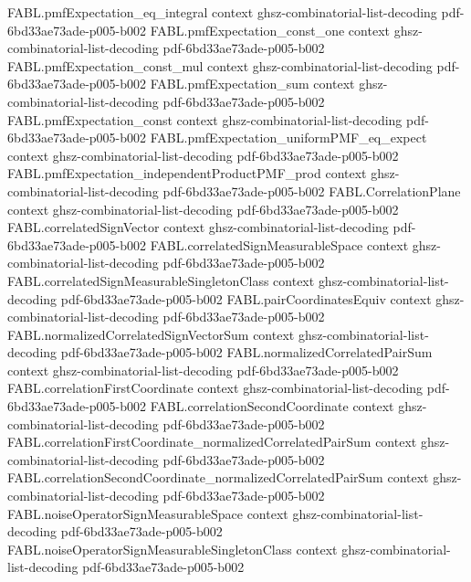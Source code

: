 \begin{theorem}
  {FABL.pmfExpectation_eq_integral}
  {context}
  {ghsz-combinatorial-list-decoding}
  {pdf-6bd33ae73ade-p005-b002}
\proofstep
  {FABL.pmfExpectation_const_one}
  {context}
  {ghsz-combinatorial-list-decoding}
  {pdf-6bd33ae73ade-p005-b002}
\proofstep
  {FABL.pmfExpectation_const_mul}
  {context}
  {ghsz-combinatorial-list-decoding}
  {pdf-6bd33ae73ade-p005-b002}
\proofstep
  {FABL.pmfExpectation_sum}
  {context}
  {ghsz-combinatorial-list-decoding}
  {pdf-6bd33ae73ade-p005-b002}
\proofstep
  {FABL.pmfExpectation_const}
  {context}
  {ghsz-combinatorial-list-decoding}
  {pdf-6bd33ae73ade-p005-b002}
\proofstep
  {FABL.pmfExpectation_uniformPMF_eq_expect}
  {context}
  {ghsz-combinatorial-list-decoding}
  {pdf-6bd33ae73ade-p005-b002}
\proofstep
  {FABL.pmfExpectation_independentProductPMF_prod}
  {context}
  {ghsz-combinatorial-list-decoding}
  {pdf-6bd33ae73ade-p005-b002}
\proofstep
  {FABL.CorrelationPlane}
  {context}
  {ghsz-combinatorial-list-decoding}
  {pdf-6bd33ae73ade-p005-b002}
\proofstep
  {FABL.correlatedSignVector}
  {context}
  {ghsz-combinatorial-list-decoding}
  {pdf-6bd33ae73ade-p005-b002}
\proofstep
  {FABL.correlatedSignMeasurableSpace}
  {context}
  {ghsz-combinatorial-list-decoding}
  {pdf-6bd33ae73ade-p005-b002}
\proofstep
  {FABL.correlatedSignMeasurableSingletonClass}
  {context}
  {ghsz-combinatorial-list-decoding}
  {pdf-6bd33ae73ade-p005-b002}
\proofstep
  {FABL.pairCoordinatesEquiv}
  {context}
  {ghsz-combinatorial-list-decoding}
  {pdf-6bd33ae73ade-p005-b002}
\proofstep
  {FABL.normalizedCorrelatedSignVectorSum}
  {context}
  {ghsz-combinatorial-list-decoding}
  {pdf-6bd33ae73ade-p005-b002}
\proofstep
  {FABL.normalizedCorrelatedPairSum}
  {context}
  {ghsz-combinatorial-list-decoding}
  {pdf-6bd33ae73ade-p005-b002}
\proofstep
  {FABL.correlationFirstCoordinate}
  {context}
  {ghsz-combinatorial-list-decoding}
  {pdf-6bd33ae73ade-p005-b002}
\proofstep
  {FABL.correlationSecondCoordinate}
  {context}
  {ghsz-combinatorial-list-decoding}
  {pdf-6bd33ae73ade-p005-b002}
\proofstep
  {FABL.correlationFirstCoordinate_normalizedCorrelatedPairSum}
  {context}
  {ghsz-combinatorial-list-decoding}
  {pdf-6bd33ae73ade-p005-b002}
\proofstep
  {FABL.correlationSecondCoordinate_normalizedCorrelatedPairSum}
  {context}
  {ghsz-combinatorial-list-decoding}
  {pdf-6bd33ae73ade-p005-b002}
\proofstep
  {FABL.noiseOperatorSignMeasurableSpace}
  {context}
  {ghsz-combinatorial-list-decoding}
  {pdf-6bd33ae73ade-p005-b002}
\proofstep
  {FABL.noiseOperatorSignMeasurableSingletonClass}
  {context}
  {ghsz-combinatorial-list-decoding}
  {pdf-6bd33ae73ade-p005-b002}

\end{theorem}

